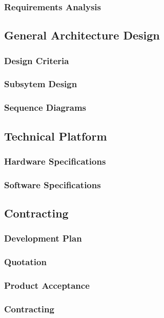 	\subsubsection{Requirements	 Analysis}
\subsection{General Architecture Design}
	\subsubsection{Design Criteria}
	\subsubsection{Subsytem Design}
	\subsubsection{Sequence Diagrams}
\subsection{Technical Platform}
	\subsubsection{Hardware Specifications}
	\subsubsection{Software Specifications}
\subsection{Contracting}
	\subsubsection{Development Plan}
	\subsubsection{Quotation}
	\subsubsection{Product Acceptance}
	\subsubsection{Contracting}


